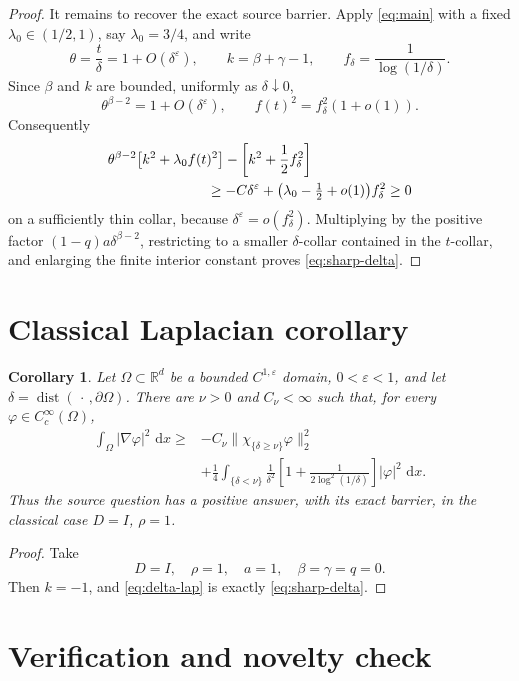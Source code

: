 \documentclass[11pt]{article}
\newtheorem{corollary}[theorem]{Corollary}
\newcommand{\R}{\mathbb R}
\newcommand{\Om}{\Omega}
\newcommand{\dd}{\,\mathrm d}
\newcommand{\dist}{\operatorname{dist}}
\newcommand{\Grad}{\nabla}
\newcommand{\eps}{\varepsilon}
\begin{document}
\begin{proof}
It remains to recover the exact source barrier.  Apply \eqref{eq:main} with
a fixed \(\lambda_0\in(1/2,1)\), say \(\lambda_0=3/4\), and write
\[
\theta=\frac{t}{\delta}=1+O(\delta^\eps),\qquad
k=\beta+\gamma-1,\qquad f_\delta=\frac1{\log(1/\delta)}.
\]
Since \(\beta\) and \(k\) are bounded, uniformly as \(\delta\downarrow0\),
\[
\theta^{\beta-2}=1+O(\delta^\eps),\qquad
f(t)^2=f_\delta^2(1+o(1)).
\]
Consequently
\begin{align*}
&\theta^{\beta-2}\bigl[k^2+\lambda_0f(t)^2\bigr]
-\left[k^2+\frac12f_\delta^2\right]\\
&\hspace{25mm}\geq
-C\delta^\eps+\bigl(\lambda_0-\tfrac12+o(1)\bigr)f_\delta^2
\geq0
\end{align*}
on a sufficiently thin collar, because
\(\delta^\eps=o(f_\delta^2)\).  Multiplying by the positive factor
\((1-q)a\delta^{\beta-2}\), restricting to a smaller
\(\delta\)-collar contained in the \(t\)-collar, and enlarging the finite
interior constant proves \eqref{eq:sharp-delta}.
\end{proof}

\section{Classical Laplacian corollary}

\begin{corollary}\label{cor:laplacian}
Let \(\Om\subset\R^d\) be a bounded \(C^{1,\eps}\) domain,
\(0<\eps<1\), and let \(\delta=\dist(\,\cdot\,,\partial\Om)\).  There are
\(\nu>0\) and \(C_\nu<\infty\) such that, for every
\(\varphi\in C_c^\infty(\Om)\),
\begin{align}
\int_\Om|\Grad\varphi|^2\,\dd x
\geq{}&-C_\nu\|\chi_{\{\delta\geq\nu\}}\varphi\|_2^2 \nonumber\\
&+\frac14\int_{\{\delta<\nu\}}\frac1{\delta^2}
\left[1+\frac1{2\log^2(1/\delta)}\right]
|\varphi|^2\,\dd x .                                 \label{eq:delta-lap}
\end{align}
Thus the source question has a positive answer, with its exact barrier, in
the classical case \(D=I\), \(\rho=1\).
\end{corollary}

\begin{proof}
Take
\[
D=I,\quad \rho=1,\quad a=1,\quad \beta=\gamma=q=0.
\]
Then \(k=-1\), and \eqref{eq:delta-lap} is exactly
\eqref{eq:sharp-delta}.
\end{proof}

\section{Verification and novelty check}
\end{document}
